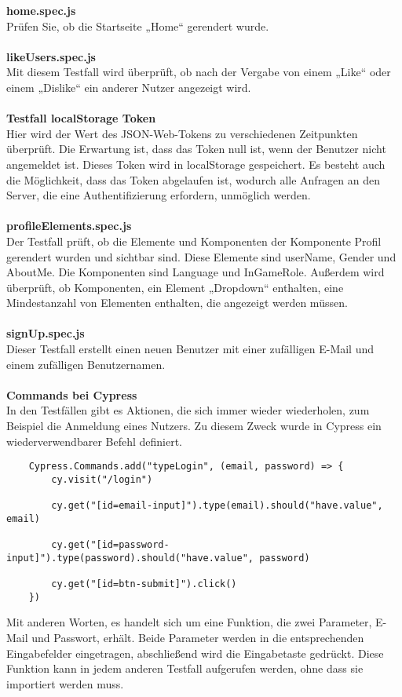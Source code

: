 \newpage
\textbf{home.spec.js}\\
Prüfen Sie, ob die Startseite „Home“ gerendert wurde.
\\\\
\textbf{likeUsers.spec.js}\\
Mit diesem Testfall wird überprüft, ob nach der Vergabe von einem „Like“ oder einem „Dislike“ ein anderer Nutzer angezeigt wird.
\\\\
\textbf{Testfall localStorage Token}\\
Hier wird der Wert des JSON-Web-Tokens zu verschiedenen Zeitpunkten überprüft.
Die Erwartung ist, dass das Token null ist, wenn der Benutzer nicht angemeldet ist.
Dieses Token wird in localStorage gespeichert.
Es besteht auch die Möglichkeit, dass das Token abgelaufen ist, wodurch alle Anfragen an den Server, die eine Authentifizierung erfordern, unmöglich werden.
\\\\
\textbf{profileElements.spec.js}\\
Der Testfall prüft, ob die Elemente und Komponenten der Komponente Profil gerendert wurden und sichtbar sind. Diese Elemente sind userName, Gender und AboutMe. Die Komponenten sind Language und InGameRole.
Außerdem wird überprüft, ob Komponenten, ein Element „Dropdown“ enthalten, eine Mindestanzahl von Elementen enthalten, die angezeigt werden müssen. 
\\\\
\textbf{signUp.spec.js}\\
Dieser Testfall erstellt einen neuen Benutzer mit einer zufälligen E-Mail und einem zufälligen Benutzernamen.  \\
\\
\textbf{Commands bei Cypress}\\
In den Testfällen gibt es Aktionen, die sich immer wieder wiederholen, zum Beispiel die Anmeldung eines Nutzers.
Zu diesem Zweck wurde in Cypress ein wiederverwendbarer Befehl definiert.
\begin{lstlisting}
    Cypress.Commands.add("typeLogin", (email, password) => {
        cy.visit("/login")
    
        cy.get("[id=email-input]").type(email).should("have.value", email)
    
        cy.get("[id=password-input]").type(password).should("have.value", password)
    
        cy.get("[id=btn-submit]").click()
    })
\end{lstlisting}
Mit anderen Worten, es handelt sich um eine Funktion, die zwei Parameter, E-Mail und Passwort, erhält. 
Beide Parameter werden in die entsprechenden Eingabefelder eingetragen, abschließend wird die Eingabetaste gedrückt.
Diese Funktion kann in jedem anderen Testfall aufgerufen werden, ohne dass sie importiert werden muss.

